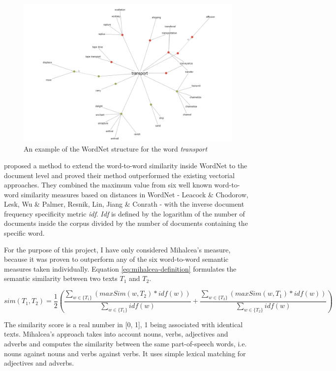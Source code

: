 \begin{figure}[ht!]
\centering
\includegraphics[width=\textwidth]{figures/transport.png}
\caption{An example of the WordNet structure for the word \textit{transport}}
\label{transport}
\end{figure} 

\citet{Mihalcea2006} proposed a method to extend the word-to-word similarity inside WordNet to the document level and proved their method outperformed the existing vectorial approaches. They combined the maximum value from six well known word-to-word similarity measures based on distances in WordNet - Leacock \& Chodorow, Lesk, Wu \& Palmer, Resnik, Lin, Jiang \& Conrath - with the inverse document frequency specificity metric \textit{idf}. \textit{Idf} is defined by the logarithm of the number of documents inside the corpus divided by the number of documents containing the specific word. 

For the purpose of this project, I have only considered Mihalcea’s measure, because it was proven to outperform any of the six word-to-word semantic measures taken individually. Equation \ref{eq:mihalcea-definition} formulates the semantic similarity between two texts $T_1$ and $T_2$.

\begin{equation}\label{eq:mihalcea-definition}
sim ({ T_1},{ T_2})= \frac{1}{2}(\frac{\sum\limits_{w\in\{T_1\}}{(maxSim(w,T_2)*idf(w))}}{\sum\limits_{w\in\{T_1\}}{idf(w)}} + \frac{\sum\limits_{w\in\{T_2\}}{(maxSim(w,T_1)*idf(w))}}{\sum\limits_{w\in\{T_2\}}{idf(w)}})
\end{equation}

The similarity score is a real number in [0, 1], 1 being associated with identical texts. Mihalcea’s approach takes into account nouns, verbs, adjectives and adverbs and computes the similarity between the same part-of-speech words, i.e. nouns against nouns and verbs against verbs. It uses simple lexical matching for adjectives and adverbs. 

